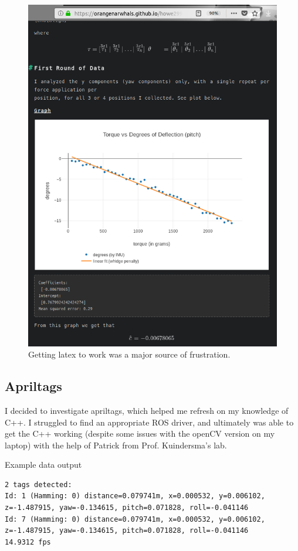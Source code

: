 \documentclass[12pt]{article}
\begin{document}
\begin{figure}[H]
\centering
\includegraphics[width=.8\textwidth]{images/misc/blog_latex.png}
\caption{Getting latex to work was a major source of frustration.}
\end{figure}

\subsection{Apriltags}
I decided to investigate apriltags, which helped me refresh on my knowledge of C++. I struggled to
find an appropriate ROS driver, and ultimately was able to get the C++ working (despite some issues
with the openCV version on my laptop) with the help of Patrick from Prof. Kuindersma's lab.

Example data output
\begin{lstlisting}
2 tags detected: 
Id: 1 (Hamming: 0) distance=0.079741m, x=0.000532, y=0.006102, z=-1.487915, yaw=-0.134615, pitch=0.071828, roll=-0.041146
Id: 7 (Hamming: 0) distance=0.079741m, x=0.000532, y=0.006102, z=-1.487915, yaw=-0.134615, pitch=0.071828, roll=-0.041146
14.9312 fps
\end{lstlisting}
\end{document}
